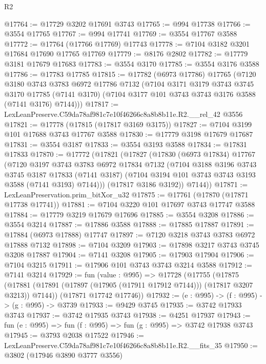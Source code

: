\begin{lexlean}{R2}
\begin{coremodule}
@17764 := @17729 @3202 @17691 @3743
@17765 := @994 @17738
@17766 := @3554 @17765
@17767 := @994 @17741
@17769 := @3554 @17767 @3588
@17772 := @17764 (@17766 @17769) @17743
@17778 := @7104 @3182 @3201 @17684 @17690 @17765 @17769
@17779 := @8176 @2802
@17782 := @17779 @3181 @17679 @17683
@17783 := @3554 @3170
@17785 := @3554 @3176 @3588
@17786 := @17783 @17785
@17815 := @17782
    (@6973 @17786)
    @17765
    (@7120
      @3180
      @3743
      @3783
      @6972
      @17786
      @7132
      (@7104
        @3171
        @3179
        @3743
        @3745
        @3170
        @17785
        (@7141 @3170)
        (@7104 @3177 @101 @3743 @3743 @3176 @3588 (@7141 @3176) @7144)))
@17817 := LexLeanPreserve.C59da78af981c7e10f46266c8a8b8b11e.R2.__rel_42 @3556
@17821 := @17778 (@17815 (@17817 @3169 @3175))
@17827 := @7104 @3199 @101 @17688 @3743 @17767 @3588
@17830 := @17779 @3198 @17679 @17687
@17831 := @3554 @3187
@17833 := @3554 @3193 @3588
@17834 := @17831 @17833
@17870 := @17772
    (@17821
      (@17827
        (@17830
          (@6973 @17834)
          @17767
          (@7120
            @3197
            @3743
            @3783
            @6972
            @17834
            @7132
            (@7104
              @3188
              @3196
              @3743
              @3745
              @3187
              @17833
              (@7141 @3187)
              (@7104 @3194 @101 @3743 @3743 @3193 @3588 (@7141 @3193) @7144)))
          (@17817 @3186 @3192))
        @7144))
@17871 := LexLeanPreservation.prim_bitXor_u32
@17875 := @17761 (@17870 (@17871 @17738 @17741))
@17881 := @7104 @3220 @101 @17697 @3743 @17747 @3588
@17884 := @17779 @3219 @17679 @17696
@17885 := @3554 @3208
@17886 := @3554 @3214
@17887 := @17886 @3588
@17888 := @17885 @17887
@17891 := @17884 (@6973 @17888) @17747
@17897 := @7120 @3218 @3743 @3783 @6972 @17888 @7132
@17898 := @7104 @3209
@17903 := @17898 @3217 @3743 @3745 @3208 @17887
@17904 := @7141 @3208
@17905 := @17903 @17904
@17906 := @7104 @3215
@17911 := @17906 @101 @3743 @3743 @3214 @3588
@17912 := @7141 @3214
@17929 := fun (value : @995) =>
  @17728
    (@17755
      (@17875 (@17881 (@17891 (@17897 (@17905 (@17911 @17912 @7144))) (@17817 @3207 @3213)) @7144))
      (@17871 @17742 @17746))
@17932 := (e : @995) -> (f : @995) -> (g : @995) -> @3739
@17933 := @9429 @3745
@17935 := @3742 @17933 @3743
@17937 := @3742 @17935 @3743
@17938 := @4251 @17937
@17943 := fun (e : @995) => fun (f : @995) => fun (g : @995) => @3742 @17938 @3743
@17945 := @3793 @2038 @17522
@17946 := LexLeanPreserve.C59da78af981c7e10f46266c8a8b8b11e.R2.__fits_35
@17950 := @3802 (@17946 @3890 @3777 @3556)

\end{coremodule}
\end{lexlean}
